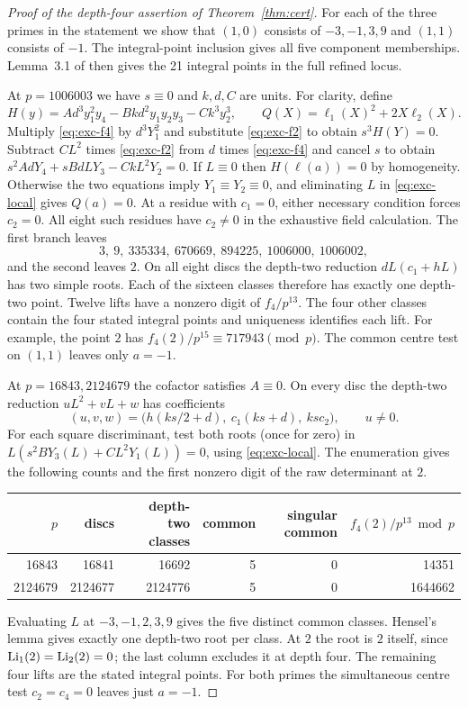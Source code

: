 \begin{proof}[Proof of the depth-four assertion of Theorem~\ref{thm:cert}]
For each of the three primes in the statement we show that $(1,0)$ consists of $-3,-1,3,9$ and
$(1,1)$ consists of $-1$. The integral-point inclusion gives all
five component memberships. Lemma~3.1 of \cite{Ludtke} then gives
the 21 integral points in the full refined locus.

At $p=1006003$ we have $s\equiv0$ and $k,d,C$ are units. For
clarity, define
\[
 H(y)=Ad^3y_1^2y_4-Bkd^2y_1y_2y_3-Ck^3y_2^3,
 \qquad Q(X)=\ell_1(X)^2+2X\ell_2(X).
\]
Multiply \eqref{eq:exc-f4} by $d^3Y_1^2$ and substitute
\eqref{eq:exc-f2} to obtain $s^3 H(Y)=0$. Subtract
$CL^2$ times \eqref{eq:exc-f2} from $d$ times \eqref{eq:exc-f4}
and cancel $s$ to obtain
$s^2AdY_4+sBdLY_3-CkL^2Y_2=0$.
If $L\equiv0$ then $H(\boldsymbol\ell(a))=0$ by homogeneity.
Otherwise the two equations imply $Y_1\equiv Y_2\equiv0$, and
eliminating $L$ in \eqref{eq:exc-local} gives $Q(a)=0$.
At a residue with $c_1=0$, either necessary condition forces
$c_2=0$. All eight such residues have $c_2\ne0$ in the exhaustive
field calculation. The first branch leaves
\[
 3,\ 9,\ 335334,\ 670669,\ 894225,\ 1006000,\ 1006002,
\]
and the second leaves $2$. On all eight discs the depth-two reduction
$dL(c_1+hL)$ has two simple roots. Each of the sixteen classes therefore
has exactly one depth-two point. Twelve lifts have a nonzero digit of
$f_4/p^{13}$. The four other classes contain the four stated integral
points and uniqueness identifies each lift. For example, the point $2$
has $f_4(2)/p^{15}\equiv717943\pmod p$. The common centre test on
$(1,1)$ leaves only $a=-1$.

At $p=16843,2124679$ the cofactor satisfies $A\equiv0$. On every
disc the depth-two reduction $uL^2+vL+w$ has coefficients
\[
 (u,v,w)=\bigl(h(ks/2+d),\ c_1(ks+d),\ ks c_2\bigr),\qquad u\ne0.
\]
For each square discriminant, test both roots (once for zero) in
$L(s^2B Y_3(L)+CL^2Y_1(L))=0$, using \eqref{eq:exc-local}.
The enumeration gives the following counts and the first nonzero
digit of the raw determinant at $2$.
\par\smallskip
{\centering
\begin{tabular}{@{}rrrrrr@{}}
\toprule
$p$ & discs & depth-two classes & common & singular common
  & $f_4(2)/p^{13}\bmod p$\\
\midrule
16843&16841&16692&5&0&14351\\
2124679&2124677&2124776&5&0&1644662\\
\bottomrule
\end{tabular}\par}
\smallskip
Evaluating $L$ at $-3,-1,2,3,9$ gives the five distinct common
classes. Hensel's lemma gives exactly one depth-two root per class.
At $2$ the root is $2$ itself, since
$\operatorname{Li}_1(2)=\operatorname{Li}_2(2)=0$; the last column
excludes it at depth four. The remaining four lifts are the stated
integral points. For both primes the simultaneous centre test
$c_2=c_4=0$ leaves just $a=-1$.
\end{proof}

